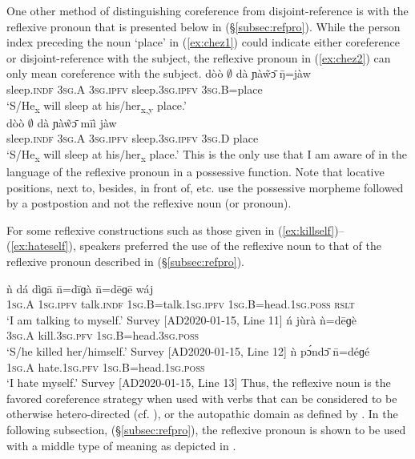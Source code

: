 \documentclass[output=paper]{langscibook}
\begin{document}
One other method of distinguishing coreference from disjoint-reference is with the reflexive pronoun that is presented below in (\S \ref{subsec:refpro}). While the person index preceding the noun `place' in (\ref{ex:chez1}) could indicate either coreference or disjoint-reference with the subject, the reflexive pronoun in (\ref{ex:chez2}) can only mean coreference with the subject.
\ea \label{ex:chez1}
\gll dòò $\emptyset$ dà ɲàw̃ɔ̄ ŋ̄=jàw \\  
	sleep.\textsc{indf} 3\textsc{sg}.A 3\textsc{sg}.\textsc{ipfv}  sleep.3\textsc{sg}.\textsc{ipfv} 3\textsc{sg}.B=place \\
	\glt `S/He\textsubscript{x} will sleep at his/her\textsubscript{x,y} place.' \citep[441]{HantganHeath2018} \\
	\z
\ea \label{ex:chez2}
\gll dòò $\emptyset$ dà ɲàw̃ɔ̄ mīì jàw \\  
	sleep.\textsc{indf} 3\textsc{sg}.A 3\textsc{sg}.\textsc{ipfv} sleep.3\textsc{sg}.\textsc{ipfv} 3\textsc{sg}.D place \\
	\glt `S/He\textsubscript{x} will sleep at his/her\textsubscript{x} place.' \citep[441]{HantganHeath2018}
	\z
This is the only use that I am aware of in the language of the reflexive pronoun in a possessive function. Note that locative positions, next to, besides, in front of, etc. use the possessive morpheme followed by a postpostion and not the reflexive noun (or pronoun).

For some reflexive constructions such as those given in  (\ref{ex:killself})--(\ref{ex:hateself}), speakers preferred the use of the reflexive noun to that of the reflexive pronoun described in (\S \ref{subsec:refpro}).	
\ea \label{ex:talkself}

\gll ǹ dá dìɡā n̄=dīɡà n̄=dēɡē wáj \\
1\textsc{sg}.A 1\textsc{sg}.\textsc{ipfv} talk.\textsc{indf} 1\textsc{sg}.B=talk.1\textsc{sg}.\textsc{ipfv} 1\textsc{sg}.B=head.1\textsc{sg}.\textsc{poss} \textsc{rslt} \\
\glt `I am talking to myself.' Survey [AD2020-01-15, Line 11]
\z
\ea \label{ex:killself}
\gll ń jùrà ǹ=dēɡè \\
3\textsc{sg}.A kill.3\textsc{sg}.\textsc{pfv} 1\textsc{sg}.B=head.3\textsc{sg}.\textsc{poss} \\	
\glt `S/he killed her/himself.' Survey [AD2020-01-15, Line 12]
\z
\ea \label{ex:hateself}
\gll ǹ pɔ́ndɔ̄ n̄=déɡé \\
1\textsc{sg}.A hate.1\textsc{sg}.\textsc{pfv} 1\textsc{sg}.B=head.1\textsc{sg}.\textsc{poss} \\	
\glt `I hate myself.' Survey [AD2020-01-15, Line 13]
\z
Thus, the reflexive noun is the favored coreference strategy when used with verbs that can be considered to be otherwise hetero-directed (cf. \citealt[7]{Puddu2019}), or the autopathic domain as defined by \cite[17]{Haspelmath2019}. In the following subsection, (\S \ref{subsec:refpro}), the reflexive pronoun is shown to be used with a middle type of meaning as depicted in \cite{Kemmer1994}.
\end{document}
